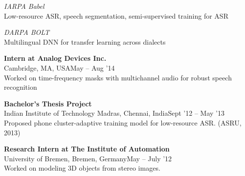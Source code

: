 \documentclass[margin,line,pifont,palatino,courier]{res}
\begin{document}
\begin{resume}
\textit{IARPA Babel} \\
Low-resource ASR, speech segmentation, semi-supervised training for ASR

\textit{DARPA BOLT}\\
Multilingual DNN for transfer learning across dialects

\textbf{Intern at Analog Devices Inc.} \\
Cambridge, MA, USA\hfill May -- Aug '14 \vspace{2pt} \\
Worked on time-frequency masks with multichannel audio for robust speech recognition
\vspace{-5pt}

\textbf{Bachelor's Thesis Project} \\
Indian Institute of Technology Madras, Chennai, India\hfill Sept '12 -- May '13 \vspace{2pt}  \\
Proposed phone cluster-adaptive training model for low-resource ASR. (ASRU, 2013)


\textbf{Research Intern at The Institute of Automation}  \\
University of Bremen, Bremen, Germany\hfill May -- July '12 \vspace{2pt}\\
Worked on modeling 3D objects from stereo images. %


\end{resume}
\end{document}
